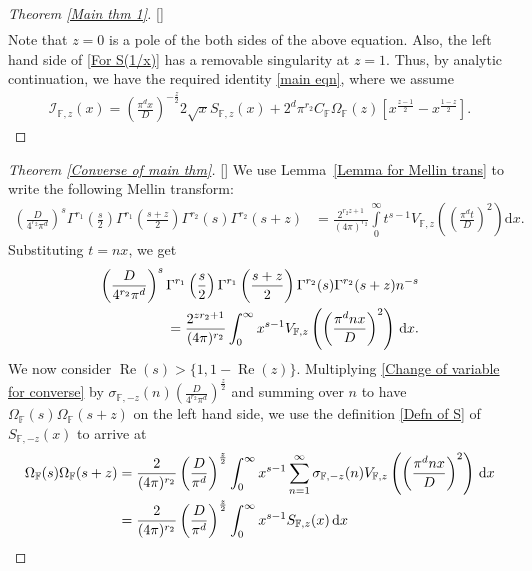 \documentclass[12pt,reqno]{amsart}
\renewcommand{\Re}{\operatorname{Re}}
\renewcommand{\(}{\left\(}
\renewcommand{\)}{\right\)}
\renewcommand{\[}{\left\[}
\renewcommand{\]}{\right\]}
\numberwithin{equation}{section}
\theoremstyle{plain}
\begin{document}
\begin{proof}[Theorem \rm{\ref{Main thm 1}}][]
\begin{align}
\end{align}
Note that $z=0$ is a pole of the both sides of the above equation. Also, the left hand side of \eqref{For S(1/x)} has a removable singularity at $z=1$. Thus, by analytic continuation, we have the required identity \eqref{main eqn}, where we assume
\begin{align*}
\mathcal{I}_{\mathbb{F}, z}(x) = \left(\frac{\pi^d x}{D}\right)^{-\frac{z}{2}}2\sqrt{x}S_{\mathbb{F}, z}(x) + 2^d\pi^{r_2}C_{\mathbb{F}}\Omega_{\mathbb{F}}(z)\left[x^{\frac{z-1}{2}} - x^{\frac{1-z}{2}} \right].
\end{align*}
\end{proof}

\begin{proof}[Theorem \rm{\ref{Converse of main thm}}][]
We use Lemma~\ref{Lemma for Mellin trans} to write the following Mellin transform:
\begin{align*}
\left(\frac{D}{4^{r_2}\pi^{d}}\right)^{s}\Gamma^{r_1}\left(\frac{s}{2}\right)\Gamma^{r_1}\left(\frac{s+z}{2}\right)\Gamma^{r_2}(s)\Gamma^{r_2}(s+z)
&= \frac{2^{r_2 z + 1}}{(4\pi)^{r_2}}\int\limits_{0}^\infty t^{s-1}V_{\mathbb{F},z}\left(\left(\frac{\pi^{d} t}{D}\right)^2\right) \mathrm{d}x.
\end{align*}
Substituting $t = nx$, we get
\begin{align}\label{Change of variable for converse}
\left(\frac{D}{4^{r_2}\pi^{d}}\right)^{s}\Gamma^{r_1}\left(\frac{s}{2}\right)\Gamma^{r_1}\left(\frac{s+z}{2}\right)\Gamma^{r_2}(s)\Gamma^{r_2}(s+z)n^{-s} \notag \\
= \frac{2^{zr_2 + 1}}{(4\pi)^{r_2}}\int_0^\infty x^{s-1}V_{\mathbb{F},z}\left(\left(\frac{\pi^{d} nx}{D}\right)^2\right)\, \text{d}x.
\end{align}
We now consider $\Re(s) > \{1, 1-\Re(z)\}$. Multiplying \eqref{Change of variable for converse} by $\sigma_{\mathbb{F},-z}(n)\left(\frac{D}{4^{r_2}\pi^d}\right)^{\frac{z}{2}}$ and summing over $n$ to have $\Omega_{\mathbb{F}}(s)\Omega_{\mathbb{F}}(s+z)$ on the left hand side, we use the definition \eqref{Defn of S} of $S_{\mathbb{F},-z}(x)$ to arrive at
\begin{align}
\Omega_{\mathbb{F}}(s)\Omega_{\mathbb{F}}(s+z) &= \frac{2}{(4\pi)^{r_2}}\left(\frac{D}{\pi^d}\right)^{\frac{z}{2}}\int_0^\infty x^{s-1}\sum_{n=1}^{\infty}\sigma_{\mathbb{F},-z}(n)V_{\mathbb{F},z}\left(\left(\frac{\pi^{d} nx}{D}\right)^2\right)\, \text{d}x \notag\\
&= \frac{2}{(4\pi)^{r_2}}\left(\frac{D}{\pi^d}\right)^{\frac{z}{2}}\int_0^\infty x^{s-1}S_{\mathbb{F}, z}(x) \, \text{d}x \notag\\

\end{align}
\end{proof}
\end{document}
